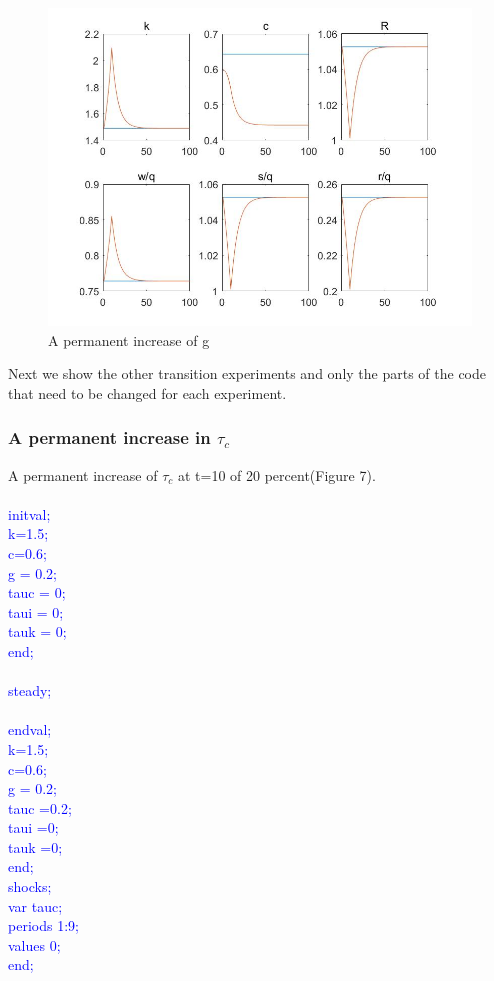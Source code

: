 \documentclass[a4paper,12pt]{scrartcl} %
\begin{document}
\begin{figure}[htbp!]
		\centering
			\includegraphics[width=0.8\linewidth]{fig6.jpg}
            \caption{A permanent increase of g}\label{6}
\end{figure}

\vspace{10cm}
Next we show the other transition experiments and only the parts of the code that need to be changed for each experiment.

\subsubsection{A permanent increase in $\tau_c$}

A permanent increase of $\tau_c$ at t=10 of 20 percent(Figure 7).\\
\\
\textcolor{blue}{
initval;\\
k=1.5;\\
c=0.6;\\
g = 0.2;\\
tauc = 0;\\
taui = 0;\\
tauk = 0;\\
end;\\
\\
steady;\\
\\
endval;\\
k=1.5;\\
c=0.6;\\
g = 0.2;\\
tauc =0.2;\\
taui =0;\\
tauk =0;\\
end;
\\
shocks;\\
var tauc;\\
periods 1:9;\\
values 0;\\
end;}\\
\end{document}
